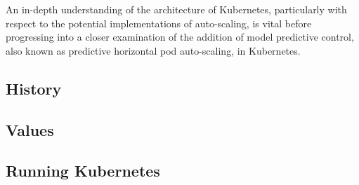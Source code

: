 An in-depth understanding of the architecture of Kubernetes, particularly with
respect to the potential implementations of auto-scaling, is vital before
progressing into a closer examination of the addition of model predictive
control, also known as predictive horizontal pod auto-scaling, in Kubernetes.

\subsection{History}



\subsection{Values}



\subsection{Running Kubernetes}


